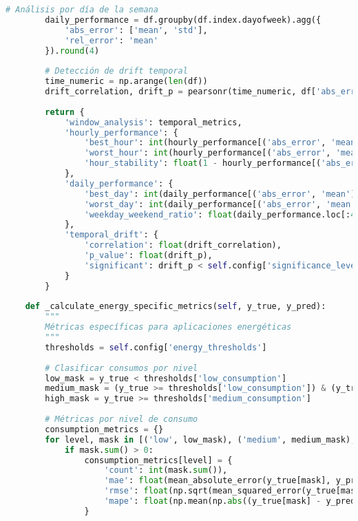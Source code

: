 \begin{lstlisting}[language=Python, caption=Framework integral de evaluación]
        # Análisis por día de la semana
        daily_performance = df.groupby(df.index.dayofweek).agg({
            'abs_error': ['mean', 'std'],
            'rel_error': 'mean'
        }).round(4)
        
        # Detección de drift temporal
        time_numeric = np.arange(len(df))
        drift_correlation, drift_p = pearsonr(time_numeric, df['abs_error'])
        
        return {
            'window_analysis': temporal_metrics,
            'hourly_performance': {
                'best_hour': int(hourly_performance[('abs_error', 'mean')].idxmin()),
                'worst_hour': int(hourly_performance[('abs_error', 'mean')].idxmax()),
                'hour_stability': float(1 - hourly_performance[('abs_error', 'mean')].std() / hourly_performance[('abs_error', 'mean')].mean())
            },
            'daily_performance': {
                'best_day': int(daily_performance[('abs_error', 'mean')].idxmin()),
                'worst_day': int(daily_performance[('abs_error', 'mean')].idxmax()),
                'weekday_weekend_ratio': float(daily_performance.loc[:4, ('abs_error', 'mean')].mean() / daily_performance.loc[5:, ('abs_error', 'mean')].mean())
            },
            'temporal_drift': {
                'correlation': float(drift_correlation),
                'p_value': float(drift_p),
                'significant': drift_p < self.config['significance_level']
            }
        }
    
    def _calculate_energy_specific_metrics(self, y_true, y_pred):
        """
        Métricas específicas para aplicaciones energéticas
        """
        thresholds = self.config['energy_thresholds']
        
        # Clasificar consumos por nivel
        low_mask = y_true < thresholds['low_consumption']
        medium_mask = (y_true >= thresholds['low_consumption']) & (y_true < thresholds['medium_consumption'])
        high_mask = y_true >= thresholds['medium_consumption']
        
        # Métricas por nivel de consumo
        consumption_metrics = {}
        for level, mask in [('low', low_mask), ('medium', medium_mask), ('high', high_mask)]:
            if mask.sum() > 0:
                consumption_metrics[level] = {
                    'count': int(mask.sum()),
                    'mae': float(mean_absolute_error(y_true[mask], y_pred[mask])),
                    'rmse': float(np.sqrt(mean_squared_error(y_true[mask], y_pred[mask]))),
                    'mape': float(np.mean(np.abs((y_true[mask] - y_pred[mask]) / np.where(y_true[mask] == 0, 1, y_true[mask]))) * 100)
                }
        

\end{lstlisting}
